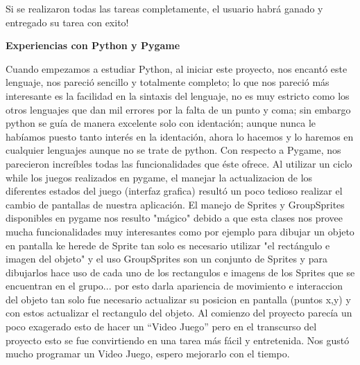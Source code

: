 \documentclass[12pt]{report}
\begin{document}

Si se realizaron todas las tareas completamente, el usuario habrá ganado y entregado su tarea con exito!

	\begingroup
		\large{
			\textbf{
				\newline
				\newline
				\newline
				Experiencias con Python y Pygame
				\newline
				\newline
			}
		}
	\endgroup

Cuando empezamos a estudiar Python, al iniciar este proyecto, nos encantó este lenguaje, nos pareció sencillo y totalmente completo; lo que nos pareció más interesante es la facilidad en la sintaxis del lenguaje, no es muy estricto como los otros lenguajes que dan mil errores por la falta de un punto y coma; sin embargo python se guía de manera excelente solo con identación; aunque nunca le habíamos puesto tanto interés en la identación, ahora lo hacemos  y lo haremos en cualquier lenguajes aunque no se trate de python.
\newline
\newline
Con respecto a Pygame, nos parecieron increíbles todas las funcionalidades que éste ofrece.
Al utilizar un ciclo while los juegos realizados en pygame, el manejar la actualizacion de los diferentes estados del juego (interfaz grafica) resultó un poco tedioso realizar el cambio de pantallas de nuestra aplicación.
\newline
\newline
El manejo de Sprites y GroupSprites disponibles en pygame nos resulto "mágico" debido a que esta clases nos provee mucha funcionalidades muy interesantes como por ejemplo para dibujar un objeto en pantalla ke herede de Sprite tan solo es necesario utilizar "el rectángulo e imagen del objeto" y el uso GroupSprites son un conjunto de Sprites y para dibujarlos hace uso de cada uno de los rectangulos e imagens de los Sprites que se encuentran en el grupo...
por esto darla apariencia de movimiento e interaccion del objeto tan solo fue necesario actualizar su posicion en pantalla (puntos x,y) y con estos actualizar el rectangulo del objeto.
\newline
\newline
Al comienzo del proyecto parecía un poco exagerado esto de hacer un “Video Juego” pero en el transcurso del proyecto esto se fue convirtiendo en una tarea más fácil y entretenida. Nos gustó mucho programar un Video Juego, espero mejorarlo con el tiempo.
\end{document}

